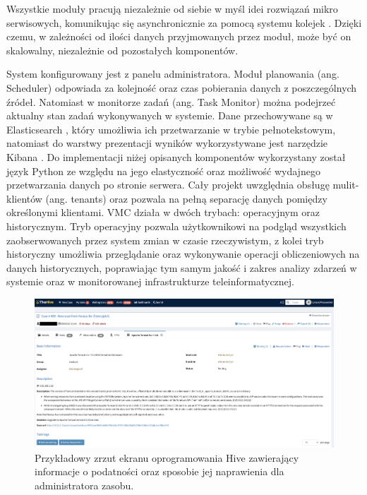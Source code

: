 \bigbreak
Wszystkie moduły pracują niezależnie od siebie w myśl idei rozwiązań mikro serwisowych, komunikując się asynchronicznie za pomocą systemu kolejek \cite{johansson2020rabbitmq}. Dzięki czemu, w zależności od ilości danych przyjmowanych przez moduł, może być on skalowalny, niezależnie od pozostałych komponentów. 

\bigbreak
System konfigurowany jest z panelu administratora. Moduł planowania (ang. Scheduler) odpowiada za kolejność oraz czas pobierania danych z poszczególnych źródeł. Natomiast w monitorze zadań (ang. Task Monitor) można podejrzeć aktualny stan zadań wykonywanych w systemie. Dane przechowywane są w Elasticsearch \cite{gheorghe2015elasticsearch}, który umożliwia ich przetwarzanie w trybie pełnotekstowym, natomiast do warstwy prezentacji wyników wykorzystywane jest narzędzie Kibana \cite{gupta2015kibana}. Do implementacji niżej opisanych komponentów wykorzystany został język Python \cite{pilgrim2009dive} ze względu na jego elastyczność oraz możliwość wydajnego przetwarzania danych po stronie serwera. Cały projekt uwzględnia obsługę mulit-klientów (ang. tenants) oraz pozwala na pełną separację danych pomiędzy określonymi klientami. VMC działa w dwóch trybach: operacyjnym oraz historycznym. Tryb operacyjny pozwala użytkownikowi na podgląd wszystkich zaobserwowanych przez system zmian w czasie rzeczywistym, z kolei tryb historyczny umożliwia przeglądanie oraz wykonywanie operacji obliczeniowych na danych historycznych, poprawiając tym samym jakość i zakres analizy zdarzeń w systemie oraz w monitorowanej infrastrukturze teleinformatycznej.

\begin{figure}[thb]
\centering
\includegraphics[width=\columnwidth]{Chapters/Rozwiazanie/vmc/hive-sample.png}
\caption{Przykładowy zrzut ekranu oprogramowania Hive zawierający informacje o podatności oraz sposobie jej naprawienia dla administratora zasobu.}
\label{fig:chapter3:hive-sample}
\end{figure}

